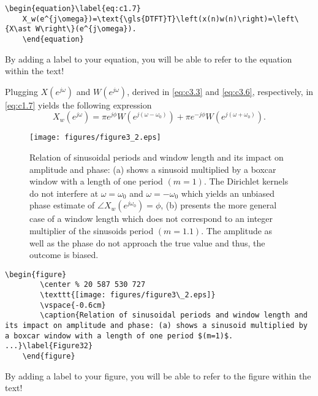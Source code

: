 \begin{mdframed}
	\begin{lstlisting}[caption={Add formulars to your text}]
	\begin{equation}\label{eq:c1.7}
	X_w(e^{j\omega})=\text{\gls{DTFT}T}\left(x(n)w(n)\right)=\left\{X\ast W\right\}(e^{j\omega}).
	\end{equation}
	\end{lstlisting}
	By adding a label to your equation, you will be able to refer to the equation within the text!
\end{mdframed}

Plugging $X(e^{j\omega})$ and $W(e^{j\omega})$, derived in \eqref{eq:c3.3} and \eqref{eq:c3.6}, respectively, in \eqref{eq:c1.7} yields the following expression
\begin{equation}\label{eq:c3.8}
X_w(e^{j\omega})=\pi e^{j\phi}W(e^{j(\omega-\omega_0)})+\pi e^{-j\phi}W(e^{j(\omega+\omega_0)}).
\end{equation}

\begin{figure}
	\center %
	\texttt{[image: figures/figure3\_2.eps]}
	\vspace{-0.6cm}
	\caption{Relation of sinusoidal periods and window length and its impact on amplitude and phase: (a) shows a sinusoid multiplied by a boxcar window with a length of one period $(m=1)$. The Dirichlet kernels do not interfere at $\omega=\omega_0$ and $\omega=-\omega_0$ which yields an unbiased phase estimate of $\angle X_w(e^{j\omega_0})=\phi$, (b) presents the more general case of a window length which does not correspond to an integer multiplier of the sinusoids period $(m=1.1)$. The amplitude as well as the phase do not approach the true value and thus, the outcome is biased.}\label{Figure32}
\end{figure}

\begin{mdframed}
	\begin{lstlisting}[caption={Example on how to add a figure to your text}]
	\begin{figure}
		\center % 20 587 530 727
		\texttt{[image: figures/figure3\_2.eps]}
		\vspace{-0.6cm}
		\caption{Relation of sinusoidal periods and window length and its impact on amplitude and phase: (a) shows a sinusoid multiplied by a boxcar window with a length of one period $(m=1)$. ...}\label{Figure32}
	\end{figure}
	\end{lstlisting}
	By adding a label to your figure, you will be able to refer to the figure within the text!
\end{mdframed}

